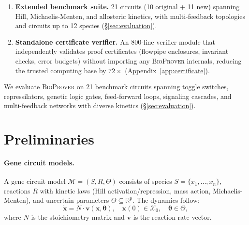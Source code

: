 \documentclass[11pt]{article}
\newcommand{\bioprover}{\textsc{BioProver}}
\newcommand{\RR}{\mathbb{R}}
\begin{document}
\begin{enumerate}[leftmargin=*,itemsep=2pt]
\item \textbf{Extended benchmark suite.} 21 circuits (10 original +
  11 new) spanning Hill, Michaelis-Menten, and allosteric kinetics,
  with multi-feedback topologies and circuits up to 12 species
  (\S\ref{sec:evaluation}).

\item \textbf{Standalone certificate verifier.} An 800-line verifier
  module that independently validates proof certificates (flowpipe
  enclosures, invariant checks, error budgets) without importing any
  \bioprover{} internals, reducing the trusted computing base by
  $72\times$ (Appendix~\ref{app:certificate}).
\end{enumerate}

\noindent We evaluate \bioprover{} on 21 benchmark circuits spanning
toggle switches, repressilators, genetic logic gates,
feed-forward loops, signaling cascades, and multi-feedback networks
with diverse kinetics (\S\ref{sec:evaluation}).

\section{Preliminaries}
\label{sec:prelim}

\paragraph{Gene circuit models.}
A gene circuit model $\mathcal{M} = (S, R, \Theta)$ consists of
species $S = \{x_1, \ldots, x_n\}$, reactions $R$ with kinetic laws
(Hill activation/repression, mass action, Michaelis-Menten), and
uncertain parameters $\Theta \subseteq \RR^p$. The dynamics follow:
\begin{equation}
  \dot{\mathbf{x}} = N \cdot \mathbf{v}(\mathbf{x}, \boldsymbol\theta),
  \quad \mathbf{x}(0) \in \mathcal{X}_0, \quad \boldsymbol\theta \in \Theta,
\end{equation}
where $N$ is the stoichiometry matrix and $\mathbf{v}$ is the reaction
rate vector.
\end{document}
